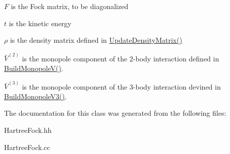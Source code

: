 \begin{DoxyItemize}
\item $ F $ is the Fock matrix, to be diagonalized
\item $ t $ is the kinetic energy
\item $\rho$ is the density matrix defined in \hyperlink{classHartreeFock_aad38c905e7e9f9e9757b5800e6910c61}{Update\-Density\-Matrix()}
\item $ \bar{V}^{(2)} $ is the monopole component of the 2-\/body interaction defined in \hyperlink{classHartreeFock_a3d6bac9b4403e4bc599a89ad0c9b6056}{Build\-Monopole\-V()}.
\item $ \bar{V}^{(3)} $ is the monopole component of the 3-\/body interaction devined in \hyperlink{classHartreeFock_a1c146af25a09f427cc626d877ec6e518}{Build\-Monopole\-V3()}. 
\end{DoxyItemize}

The documentation for this class was generated from the following files\-:\begin{DoxyCompactItemize}
\item 
Hartree\-Fock.\-hh\item 
Hartree\-Fock.\-cc\end{DoxyCompactItemize}
